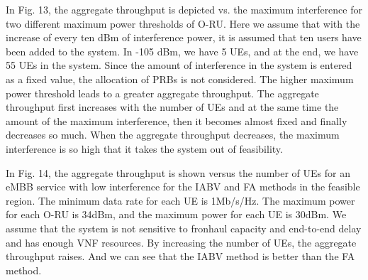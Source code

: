 \documentclass[lettersize,journal]{IEEEtran}
\begin{document}

In Fig. 13, the aggregate throughput is depicted vs. the maximum interference for two different maximum power thresholds of O-RU. 
Here we assume that with the increase of every ten dBm of interference power, it is assumed that ten users have been added to the system. In -105 dBm, we have 5 UEs, and at the end, we have 55 UEs in the system.
Since the amount of interference in the system is entered as a fixed value,
the allocation of PRBs is not considered.
The higher maximum power threshold leads to a greater aggregate throughput.
The aggregate throughput first increases with the number of UEs and at the same time the amount of the maximum interference, then it becomes almost fixed and finally decreases so much. When the aggregate throughput decreases, the maximum interference is so high that it takes the system out of feasibility.


In Fig. 14, the aggregate throughput is shown versus
the number of UEs for an eMBB service with low interference for the IABV and FA methods in the feasible region.
The minimum data rate for each UE is 1Mb/s/Hz.
The maximum power for each O-RU is 34dBm, and the maximum power for each UE is 30dBm. We assume that the system is not sensitive to fronhaul capacity and end-to-end delay and has enough VNF resources.
By increasing the number of UEs, the aggregate throughput raises.
And we can see that the IABV method is better than the FA method.
\end{document}
